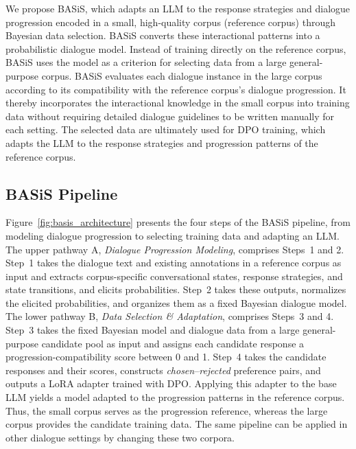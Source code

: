 \documentclass[manuscript,review,anonymous]{acmart}
\begin{document}
We propose BASiS, which adapts an LLM to the response strategies and dialogue progression encoded in a small, high-quality corpus (reference corpus) through Bayesian data selection. BASiS converts these interactional patterns into a probabilistic dialogue model. Instead of training directly on the reference corpus, BASiS uses the model as a criterion for selecting data from a large general-purpose corpus.
BASiS evaluates each dialogue instance in the large corpus according to its compatibility with the reference corpus's dialogue progression. It thereby incorporates the interactional knowledge in the small corpus into training data without requiring detailed dialogue guidelines to be written manually for each setting.
The selected data are ultimately used for DPO training, which adapts the LLM to the response strategies and progression patterns of the reference corpus.

\subsection{BASiS Pipeline}
\label{sec:method_architecture}

Figure~\ref{fig:basis_architecture} presents the four steps of the BASiS pipeline, from modeling dialogue progression to selecting training data and adapting an LLM. The upper pathway A, \emph{Dialogue Progression Modeling}, comprises Steps~1 and 2. Step~1 takes the dialogue text and existing annotations in a reference corpus as input and extracts corpus-specific conversational states, response strategies, and state transitions, and elicits probabilities. Step~2 takes these outputs, normalizes the elicited probabilities, and organizes them as a fixed Bayesian dialogue model.
The lower pathway B, \emph{Data Selection \& Adaptation}, comprises Steps~3 and 4. Step~3 takes the fixed Bayesian model and dialogue data from a large general-purpose candidate pool as input and assigns each candidate response a progression-compatibility score between 0 and 1. Step~4 takes the candidate responses and their scores, constructs \emph{chosen}--\emph{rejected} preference pairs, and outputs a LoRA adapter trained with DPO. Applying this adapter to the base LLM yields a model adapted to the progression patterns in the reference corpus. Thus, the small corpus serves as the progression reference, whereas the large corpus provides the candidate training data. The same pipeline can be applied in other dialogue settings by changing these two corpora.
\end{document}
